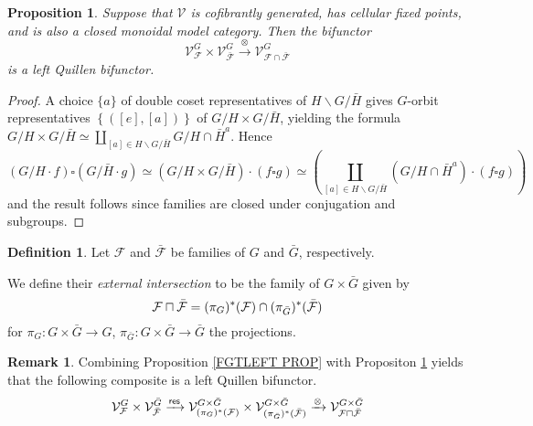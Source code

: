 \documentclass[a4paper,10pt
,draft
]{article}%
\numberwithin{equation}{section}
\numberwithin{figure}{section}
\newtheorem{proposition}[equation]{Proposition}%
\theoremstyle{definition} %
\newtheorem{definition}[equation]{Definition}%
\newtheorem{remark}[equation]{Remark}%
\newcommand{\1}{\ensuremath{\mathbbm 1}}%
\begin{document}
\begin{proposition}\label{BIQUILLENG PROP}
	Suppose that $\mathcal{V}$ is cofibrantly generated, has cellular fixed points, and is also a closed monoidal model category. 	
	Then the bifunctor
\[
	\mathcal{V}^G_{\mathcal{F}}
		\times
	\mathcal{V}^G_{\bar{\mathcal{F}}}
		\xrightarrow{\otimes}
	\mathcal{V}^G_{\mathcal{F} \cap \bar{\mathcal{F}}}
\]
	is a left Quillen bifunctor.
\end{proposition}


\begin{proof}
	A choice $\{a\}$ of double coset representatives
	of $H \backslash G /\bar{H}$
	gives $G$-orbit representatives
	$\left\{([e],[a])\right\}$ of
	$G/H \times G/\bar{H}$,
	yielding the formula
	$G/H \times G/\bar{H}
	\simeq 
	\coprod_{[a]\in H \backslash G /\bar{H}}
	{G/H\cap \bar{H}^a}
	$.
%
	Hence
\[
	\left(G/H \cdot f\right) \square \left(G/\bar{H} \cdot g\right)
		\simeq
	\left(G/H \times G/\bar{H}\right) \cdot \left(f \square g\right)
		\simeq
	\left(
		\coprod_{[a]\in H \backslash G /\bar{H}}
		{\left(G/H\cap \bar{H}^a\right)} \cdot (f \square g)
	\right)
\]
and the result follows since families are closed under conjugation and subgroups.
\end{proof}


\begin{definition}\label{EXTERINT DEF}
Let $\mathcal{F}$ and $\bar{\mathcal{F}}$ be families of $G$ and $\bar{G}$, respectively.

We define their \textit{external intersection} to be the 
family of $G \times \bar{G}$ given by
\[
	\mathcal{F} \sqcap \bar{\mathcal{F}}
=
	(\pi_{G})^{\**} (\mathcal{F}) 
		\cap
	(\pi_{\bar{G}})^{\**} (\bar{\mathcal{F}})
\]
for 
$\pi_G \colon G \times \bar{G} \to G$,
$\pi_{\bar{G}} \colon G \times \bar{G} \to \bar{G}$
the projections.
\end{definition}


\begin{remark}
	Combining Proposition \ref{FGTLEFT PROP} 
	with Propositon \ref{BIQUILLENG PROP} yields that
	the following composite is a left Quillen bifunctor.
\begin{equation}\label{EXTERINTADJ EQ}
	\mathcal{V}^{G}_{\mathcal{F}}
		\times
	\mathcal{V}^{\bar{G}}_{\bar{\mathcal{F}}}
		\xrightarrow{\mathsf{res}}
	\mathcal{V}^{G \times \bar{G}}_{
	(\pi_G)^{\**}(\mathcal{F})}
		\times
	\mathcal{V}^{G \times \bar{G}}_{
	(\pi_{\bar{G}})^{\**}(\bar{\mathcal{F}})}
		\xrightarrow{\otimes}
	\mathcal{V}^{G \times \bar{G}}_{
	\mathcal{F} \sqcap \bar{\mathcal{F}}}
\end{equation}
\end{remark}
\end{document}
